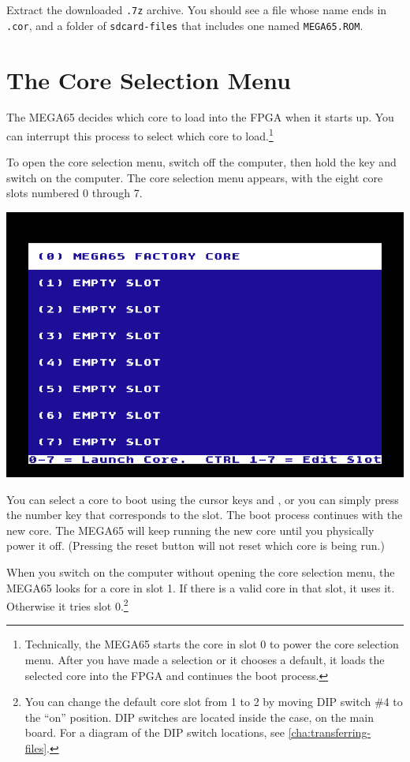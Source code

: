 Extract the downloaded {\tt .7z} archive. You should see a file whose name ends in {\tt .cor}, and a folder of {\tt sdcard-files} that includes one named {\tt MEGA65.ROM}.

\section{The Core Selection Menu}

The MEGA65 decides which core to load into the FPGA when it starts up. You can interrupt this process to select which core to load.\footnote{Technically, the MEGA65 starts the core in slot 0 to power the core selection menu. After you have made a selection or it chooses a default, it loads the selected core into the FPGA and continues the boot process.}

To open the core selection menu, switch off the computer, then hold the  key and switch on the computer. The core selection menu appears, with the eight core slots numbered 0 through 7.

\begin{center}
  \includegraphics[width=0.7\linewidth]{images/ss-flashmenu.png}
\end{center}

You can select a core to boot using the cursor keys and , or you can simply press the number key that corresponds to the slot. The boot process continues with the new core. The MEGA65 will keep running the new core until you physically power it off. (Pressing the reset button will not reset which core is being run.)

When you switch on the computer without opening the core selection menu, the MEGA65 looks for a core in slot 1. If there is a valid core in that slot, it uses it. Otherwise it tries slot 0.\footnote{You can change the default core slot from 1 to 2 by moving DIP switch \#4 to the ``on'' position. DIP switches are located inside the case, on the main board. For a diagram of the DIP switch locations, see \vref{cha:transferring-files}.}

